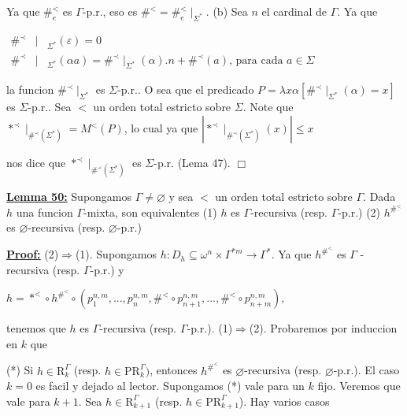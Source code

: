 Ya que \(\#_{e}^{< }\) es \(\Gamma \)-p.r., eso es \(\#^{< }=\#_{e}^{< }\mid _{\Sigma ^{\ast }}\).
(b) Sea \(n\) el cardinal de \(\Gamma .\) Ya que

\(\displaystyle \begin{array}{rcl} \#^{\prec } & \mid & _{\Sigma ^{\ast }}(\varepsilon )=0 \\ \#^{\prec } & \mid & _{\Sigma ^{\ast }}(\alpha a)=\#^{\prec }\mid _{\Sigma ^{\ast }}(\alpha ).n+\#^{\prec }(a)\text{, para cada }a\in \Sigma \end{array} \)

la funcion \(\#^{\prec }\mid _{\Sigma ^{\ast }}\) es \(\Sigma \)-p.r.. O sea que el predicado \(P=\lambda x\alpha \left[ \#^{\prec }\mid _{\Sigma ^{\ast }}(\alpha )=x\right] \) es \(\Sigma \)-p.r.. Sea \(< \) un orden total estricto sobre \(\Sigma \). Note que \(\ast ^{\prec }\mid _{\#^{\prec }(\Sigma ^{\ast })}=M^{< }(P)\), lo cual ya que
\(\displaystyle \left\vert \ast ^{\prec }\mid _{\#^{\prec }(\Sigma ^{\ast })}(x)\right\vert \leq x \)

nos dice que \(\ast ^{\prec }\mid _{\#^{\prec }(\Sigma ^{\ast })}\) es \(\Sigma \)-p.r. (Lema 47). \(\Box\)


\textbf{\underline{Lemma 50:}} Supongamos \(\Gamma \neq \varnothing \) y sea \(< \) un orden total estricto sobre \( \Gamma \). Dada \(h\) una funcion \(\Gamma \)-mixta, son equivalentes
(1) \(h\) es \(\Gamma \)-recursiva (resp. \(\Gamma \)-p.r.)
(2) \(h^{\#^{< }}\) es \(\varnothing \)-recursiva (resp. \(\varnothing \)-p.r.)

\textbf{\underline{Proof:}} (2)\(\Rightarrow \)(1). Supongamos \(h:D_{h}\subseteq \omega ^{n}\times \Gamma ^{\ast m}\rightarrow \Gamma ^{\ast }\). Ya que \(h^{\#^{< }}\) es \(\Gamma \) -recursiva (resp. \(\Gamma \)-p.r.) y

\(\displaystyle h=\ast ^{< }\circ h^{\#^{< }}\circ \left( p_{1}^{n,m},...,p_{n}^{n,m},\#^{< }\circ p_{n+1}^{n,m},...,\#^{< }\circ p_{n+m}^{n,m}\right) \text{,} \)

tenemos que \(h\) es \(\Gamma \)-recursiva (resp. \(\Gamma \)-p.r.).
(1)\(\Rightarrow \)(2). Probaremos por induccion en \(k\) que

(*) Si \(h\in \mathrm{R}_{k}^{\Gamma }\) (resp. \(h\in \mathrm{PR} _{k}^{\Gamma })\), entonces \(h^{\#^{< }}\) es \(\varnothing \)-recursiva (resp. \( \varnothing \)-p.r.).
El caso \(k=0\) es facil y dejado al lector. Supongamos (*) vale para un \(k\) fijo. Veremos que vale para \(k+1\). Sea \(h\in \mathrm{R} _{k+1}^{\Gamma }\) (resp. \(h\in \mathrm{PR}_{k+1}^{\Gamma }\)). Hay varios casos

